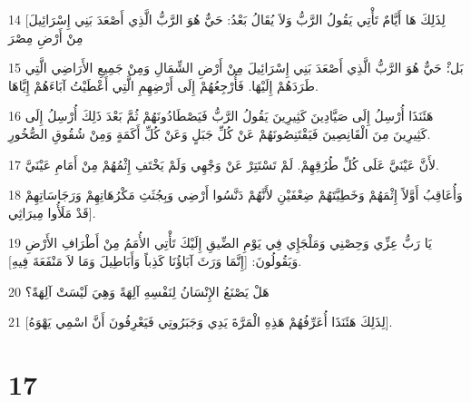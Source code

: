 \par 14 [لِذَلِكَ هَا أَيَّامٌ تَأْتِي يَقُولُ الرَّبُّ وَلاَ يُقَالُ بَعْدُ: حَيٌّ هُوَ الرَّبُّ الَّذِي أَصْعَدَ بَنِي إِسْرَائِيلَ مِنْ أَرْضِ مِصْرَ
\par 15 بَل:ْ حَيٌّ هُوَ الرَّبُّ الَّذِي أَصْعَدَ بَنِي إِسْرَائِيلَ مِنْ أَرْضِ الشِّمَالِ وَمِنْ جَمِيعِ الأَرَاضِي الَّتِي طَرَدَهُمْ إِلَيْهَا. فَأُرْجِعُهُمْ إِلَى أَرْضِهِمِ الَّتِي أَعْطَيْتُ آبَاءَهُمْ إِيَّاهَا.
\par 16 هَئَنَذَا أُرْسِلُ إِلَى صَيَّادِينَ كَثِيرِينَ يَقُولُ الرَّبُّ فَيَصْطَادُونَهُمْ ثُمَّ بَعْدَ ذَلِكَ أُرْسِلُ إِلَى كَثِيرِينَ مِنَ الْقَانِصِينَ فَيَقْتَنِصُونَهُمْ عَنْ كُلِّ جَبَلٍ وَعَنْ كُلِّ أَكَمَةٍ وَمِنْ شُقُوقِ الصُّخُورِ.
\par 17 لأَنَّ عَيْنَيَّ عَلَى كُلِّ طُرُقِهِمْ. لَمْ تَسْتَتِرْ عَنْ وَجْهِي وَلَمْ يَخْتَفِ إِثْمُهُمْ مِنْ أَمَامِ عَيْنَيَّ.
\par 18 وَأُعَاقِبُ أَوَّلاً إِثْمَهُمْ وَخَطِيَّتَهُمْ ضِعْفَيْنِ لأَنَّهُمْ دَنَّسُوا أَرْضِي وَبِجُثَثِ مَكْرُهَاتِهِمْ وَرَجَاسَاتِهِمْ قَدْ مَلَأُوا مِيرَاثِي].
\par 19 يَا رَبُّ عِزِّي وَحِصْنِي وَمَلْجَإِي فِي يَوْمِ الضِّيقِ إِلَيْكَ تَأْتِي الأُمَمُ مِنْ أَطْرَافِ الأَرْضِ وَيَقُولُونَ: [إِنَّمَا وَرَثَ آبَاؤُنَا كَذِباً وَأَبَاطِيلَ وَمَا لاَ مَنْفَعَةَ فِيهِ].
\par 20 هَلْ يَصْنَعُ الإِنْسَانُ لِنَفْسِهِ آلِهَةً وَهِيَ لَيْسَتْ آلِهَةً؟
\par 21 [لِذَلِكَ هَئَنَذَا أُعَرِّفُهُمْ هَذِهِ الْمَرَّةَ يَدِي وَجَبَرُوتِي فَيَعْرِفُونَ أَنَّ اسْمِي يَهْوَهُ].

\chapter{17}

